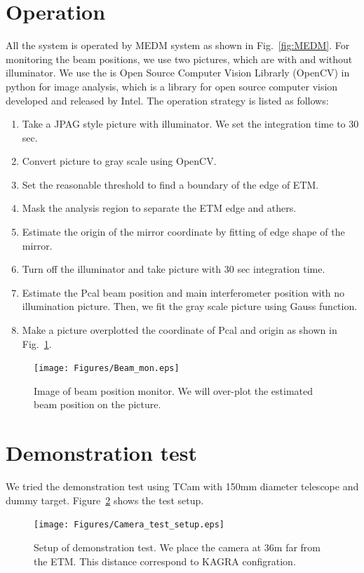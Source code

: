 \section{Operation}
All the system is operated by MEDM system as shown in Fig.~\ref{fig:MEDM}.
For monitoring the beam positions, we use two pictures, which are with and without illuminator. We use the is Open Source Computer Vision Librarly (OpenCV) in python for image analysis, which is a library for open source computer vision developed and released by Intel.
The operation strategy is listed as follows:
\begin{enumerate}
 \item Take a JPAG style picture with illuminator. We set the integration time to 30 sec.
  \item Convert picture to gray scale using OpenCV.
  \item Set the reasonable threshold to find a boundary of the edge of ETM. 
   \item Mask the analysis region to separate the ETM edge and athers.
 \item Estimate the origin of the mirror coordinate by fitting of edge shape of the mirror.
 \item Turn off the illuminator and take picture with 30 sec integration time.
  \item Estimate the Pcal beam position and main interferometer position with no illumination picture. Then, we fit the gray scale picture using Gauss function.
   \item Make a picture overplotted the coordinate of Pcal and origin as shown in Fig.~\ref{fig:Beam_mon}.
   \end{enumerate}
   \begin{figure}
\begin{center}
\texttt{[image: Figures/Beam\_mon.eps]}
\caption{Image of beam position monitor. We will over-plot the estimated beam position on the picture.} 
\label{fig:Beam_mon} 
\end{center}
\end{figure}


\section{Demonstration test}
We tried the demonstration test using TCam with 150mm diameter telescope and dummy target.
Figure~\ref{fig:Camera_test_setup} shows the test setup. 

   \begin{figure}
\begin{center}
\texttt{[image: Figures/Camera\_test\_setup.eps]}
\caption{Setup of demonstration test. We place the camera at 36m far from the ETM. This distance correspond to KAGRA configration.} 
\label{fig:Camera_test_setup} 
\end{center}
\end{figure}

